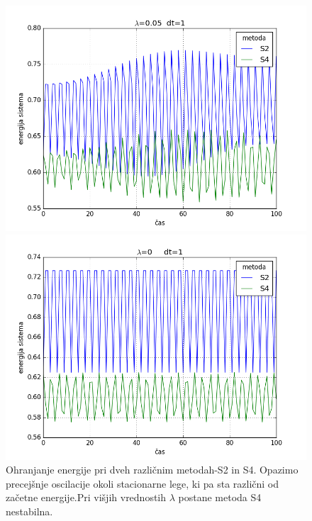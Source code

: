 \documentclass[slovene,11pt,a4paper]{article}
\numberwithin{equation}{section} %
\numberwithin{figure}{section} %
\numberwithin{table}{section} %
\begin{document}
\begin{figure}[!htb]
\centering
\begin{minipage}{0.5\textwidth}
\centering
\includegraphics[scale=0.45]{slike/energija_0_1.png}
\end{minipage}\hfill
\begin{minipage}{0.5\textwidth}
\centering
\includegraphics[scale=0.45]{slike/energija_0_2.png}
\end{minipage}

\caption{Ohranjanje energije pri dveh različnim metodah-S2 in S4. Opazimo precejšnje oscilacije okoli stacionarne lege, ki pa sta različni od začetne energije.Pri višjih vrednostih $\lambda$ postane metoda S4 nestabilna.}
\end{figure}
\end{document}
